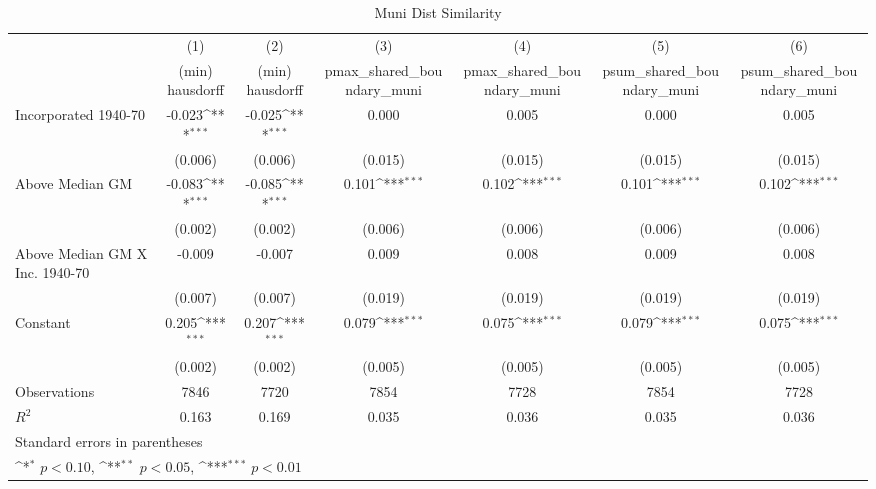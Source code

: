 \begin{table}[htbp]\centering
\def\sym#1{\ifmmode^{#1}\else\(^{#1}\)\fi}
\caption{Muni Dist Similarity}
\begin{tabular}{l*{6}{c}}
\hline\hline
                    &\multicolumn{1}{c}{(1)}&\multicolumn{1}{c}{(2)}&\multicolumn{1}{c}{(3)}&\multicolumn{1}{c}{(4)}&\multicolumn{1}{c}{(5)}&\multicolumn{1}{c}{(6)}\\
                    &\multicolumn{1}{c}{(min) hausdorff}&\multicolumn{1}{c}{(min) hausdorff}&\multicolumn{1}{c}{pmax\_shared\_boundary\_muni}&\multicolumn{1}{c}{pmax\_shared\_boundary\_muni}&\multicolumn{1}{c}{psum\_shared\_boundary\_muni}&\multicolumn{1}{c}{psum\_shared\_boundary\_muni}\\
\hline
Incorporated 1940-70&      -0.023\sym{***}&      -0.025\sym{***}&       0.000         &       0.005         &       0.000         &       0.005         \\
                    &     (0.006)         &     (0.006)         &     (0.015)         &     (0.015)         &     (0.015)         &     (0.015)         \\
[1em]
Above Median GM     &      -0.083\sym{***}&      -0.085\sym{***}&       0.101\sym{***}&       0.102\sym{***}&       0.101\sym{***}&       0.102\sym{***}\\
                    &     (0.002)         &     (0.002)         &     (0.006)         &     (0.006)         &     (0.006)         &     (0.006)         \\
[1em]
Above Median GM X Inc. 1940-70&      -0.009         &      -0.007         &       0.009         &       0.008         &       0.009         &       0.008         \\
                    &     (0.007)         &     (0.007)         &     (0.019)         &     (0.019)         &     (0.019)         &     (0.019)         \\
[1em]
Constant            &       0.205\sym{***}&       0.207\sym{***}&       0.079\sym{***}&       0.075\sym{***}&       0.079\sym{***}&       0.075\sym{***}\\
                    &     (0.002)         &     (0.002)         &     (0.005)         &     (0.005)         &     (0.005)         &     (0.005)         \\
\hline
Observations        &        7846         &        7720         &        7854         &        7728         &        7854         &        7728         \\
\(R^{2}\)           &       0.163         &       0.169         &       0.035         &       0.036         &       0.035         &       0.036         \\
\hline\hline
\multicolumn{7}{l}{\footnotesize Standard errors in parentheses}\\
\multicolumn{7}{l}{\footnotesize \sym{*} \(p<0.10\), \sym{**} \(p<0.05\), \sym{***} \(p<0.01\)}\\
\end{tabular}
\end{table}
